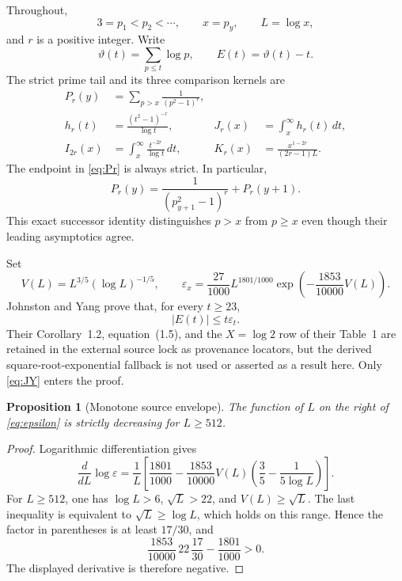 \documentclass[11pt]{article}
\newtheorem{proposition}[theorem]{Proposition}
\theoremstyle{definition}
\theoremstyle{remark}
\newcommand{\eps}{\varepsilon}
\begin{document}
Throughout,
\[
 3=p_1<p_2<\cdots,\qquad x=p_y,\qquad L=\log x,
\]
and $r$ is a positive integer.  Write
\[
 \vartheta(t)=\sum_{p\le t}\log p,
 \qquad E(t)=\vartheta(t)-t.
\]
The strict prime tail and its three comparison kernels are
\begin{align}
 P_r(y)&=\sum_{p>x}\frac{1}{(p^2-1)^r},
 \label{eq:Pr}\\
 h_r(t)&=\frac{(t^2-1)^{-r}}{\log t},
 &J_r(x)&=\int_x^\infty h_r(t)\,dt,
 \label{eq:Jr}\\
 I_{2r}(x)&=\int_x^\infty\frac{t^{-2r}}{\log t}\,dt,
 &K_r(x)&=\frac{x^{1-2r}}{(2r-1)L}.
 \label{eq:IK}
\end{align}
The endpoint in \eqref{eq:Pr} is always strict.  In particular,
\begin{equation}
 P_r(y)=\frac{1}{(p_{y+1}^2-1)^r}+P_r(y+1).
 \label{eq:successor}
\end{equation}
This exact successor identity distinguishes $p>x$ from $p\ge x$ even
though their leading asymptotics agree.

Set
\begin{equation}
 V(L)=L^{3/5}(\log L)^{-1/5},\qquad
 \eps_x=\frac{27}{1000}L^{1801/1000}
 \exp\!\left(-\frac{1853}{10000}V(L)\right).
 \label{eq:epsilon}
\end{equation}
Johnston and Yang prove that, for every $t\ge23$,
\begin{equation}
 |E(t)|\le t\eps_t.
 \label{eq:JY}
\end{equation}
Their Corollary~1.2, equation~(1.5), and the $X=\log2$ row of their
Table~1 are retained in the external source lock as provenance locators,
but the derived square-root-exponential fallback is not used or asserted
as a result here.  Only \eqref{eq:JY} enters the proof.

\begin{proposition}[Monotone source envelope]
\label{prop:eta-monotone}
The function of $L$ on the right of \eqref{eq:epsilon} is strictly
decreasing for $L\ge512$.
\end{proposition}

\begin{proof}
Logarithmic differentiation gives
\[
 \frac{d}{dL}\log\eps
 =\frac1L\left[
 \frac{1801}{1000}
 -\frac{1853}{10000}V(L)
 \left(\frac35-\frac{1}{5\log L}\right)
 \right].
\]
For $L\ge512$, one has $\log L>6$, $\sqrt L>22$, and
$V(L)\ge\sqrt L$.  The last inequality is equivalent to
$\sqrt L\ge\log L$, which holds on this range.  Hence the factor in
parentheses is at least $17/30$, and
\[
 \frac{1853}{10000}\,22\,\frac{17}{30}
 -\frac{1801}{1000}>0.
\]
The displayed derivative is therefore negative.
\end{proof}
\end{document}
